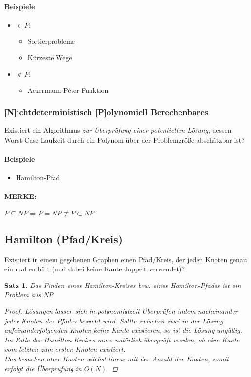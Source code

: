 \documentclass{article}
\begin{document}
\paragraph*{Beispiele}
\begin{itemize}
    \item $\in P$:
          \begin{itemize}
              \item Sortierprobleme
              \item Kürzeste Wege
          \end{itemize}
    \item $\notin P$:
          \begin{itemize}
              \item Ackermann-P\'eter-Funktion
          \end{itemize}
\end{itemize}
\subsubsection{[N]ichtdeterministisch [P]olynomiell Berechenbares}
Existiert ein Algorithmus \emph{zur Überprüfung einer potentiellen Lösung}, dessen Worst-Case-Laufzeit durch ein Polynom über der Problemgröße abschätzbar ist?
\paragraph*{Beispiele}
\begin{itemize}
    \item Hamilton-Pfad
\end{itemize}
\paragraph*{MERKE:}
$P \subseteq NP \Rightarrow P = NP\not\equiv P \subset NP$
\subsection{Hamilton (Pfad/Kreis)}
Existiert in einem gegebenen Graphen einen Pfad/Kreis, der jeden Knoten genau ein mal enthält (und dabei keine Kante doppelt verwendet)?
\newtheorem*{hamiltonnp}{Satz}
\begin{framed}
    \begin{hamiltonnp}
        Das Finden eines Hamilton-Kreises bzw. eines Hamilton-Pfades ist ein Problem aus NP. 
        \begin{proof}
            Lösungen lassen sich in polynomialzeit Überprüfen indem nacheinander jeder Knoten des Pfades besucht wird. Sollte zwischen zwei in der Lösung aufeinanderfolgenden Knoten keine Kante existieren, so ist die Lösung ungültig. Im Falle des Hamilton-Kreises muss natürlich überprüft werden, ob eine Kante vom letzten zum ersten Knoten existiert.\\
            Das besuchen aller Knoten wächst linear mit der Anzahl der Knoten, somit erfolgt die Überprüfung in $O(N)$.
        \end{proof}
    \end{hamiltonnp}
\end{framed}
\end{document}
